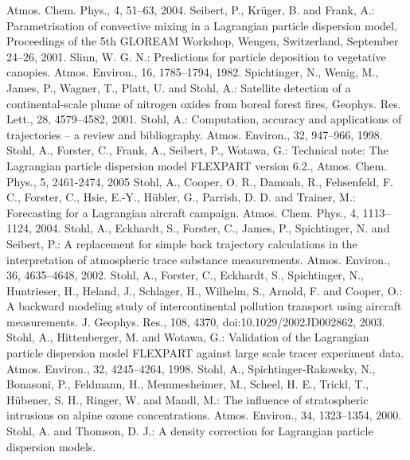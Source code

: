\documentclass{egu}            %
\begin{document}
\begin{thebibliography}{}
Atmos. Chem. Phys., 4, 51--63, 2004.
Seibert, P., Kr\"uger, B. and Frank, A.:
Parametrisation of convective mixing in a Lagrangian particle dispersion model, Proceedings of the 5th GLOREAM Workshop, Wengen, Switzerland, September 24--26, 2001.
Slinn, W. G. N.:
Predictions for particle deposition to vegetative canopies.
Atmos. Environ., 16, 1785--1794, 1982.
Spichtinger, N., Wenig, M., James, P., Wagner, T., Platt, U. and Stohl, A.:
Satellite detection of a continental-scale plume of nitrogen oxides from boreal forest fires,
Geophys. Res. Lett., 28, 4579--4582, 2001.
Stohl, A.:
Computation, accuracy and applications of trajectories -- a review and bibliography.
Atmos. Environ., 32, 947--966, 1998.
Stohl, A., Forster, C., Frank, A., Seibert, P., Wotawa, G.: 
Technical note: The Lagrangian particle dispersion model FLEXPART version 6.2., 
Atmos. Chem. Phys., 5, 2461-2474, 2005
Stohl, A., Cooper, O. R., Damoah, R., Fehsenfeld, F. C., Forster, C., Hsie, E.-Y., Hübler, G., Parrish,
D. D. and Trainer, M.:
Forecasting for a Lagrangian aircraft campaign.
Atmos. Chem. Phys., 4, 1113--1124, 2004.
Stohl, A., Eckhardt, S., Forster, C., James, P., Spichtinger, N. and Seibert, P.:
A replacement for simple back trajectory calculations in the interpretation of atmospheric trace substance measurements.
Atmos. Environ., 36, 4635--4648, 2002.
Stohl, A., Forster, C., Eckhardt, S., Spichtinger, N., Huntrieser, H., Heland, J., Schlager, H., Wilhelm, S., Arnold, F. and Cooper, O.:
A backward modeling study of intercontinental pollution transport using aircraft measurements.
J. Geophys. Res., 108, 4370, doi:10.1029/2002JD002862, 2003.
Stohl, A., Hittenberger, M. and Wotawa, G.:
Validation of the Lagrangian particle dispersion model FLEXPART against large scale tracer experiment data.
Atmos. Environ., 32, 4245--4264, 1998.
Stohl, A., Spichtinger-Rakowsky, N., Bonasoni, P., Feldmann, H., Memmesheimer, M., Scheel, H. E., Trickl, T., H\"ubener, S. H., Ringer, W. and Mandl, M.:
The influence of stratospheric intrusions on alpine ozone concentrations.
Atmos. Environ., 34, 1323--1354, 2000. 
Stohl, A. and Thomson, D. J.:
A density correction for Lagrangian particle dispersion models.

\end{thebibliography}
\end{document}
